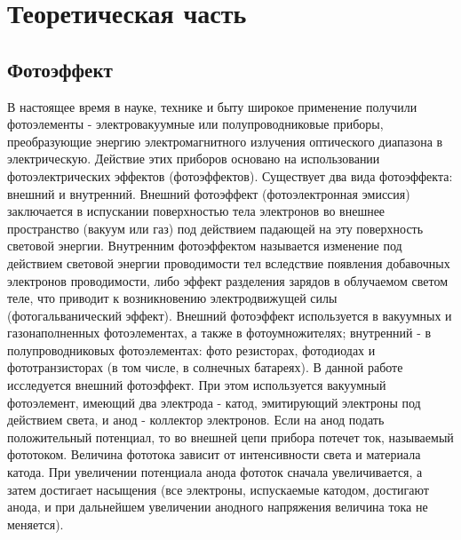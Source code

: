 



\def\labauthors{Сарафанов Ф.Г., Понур К.А., Сидоров Д. Батькович}
\def\labgroup{430}
\def\labnumber{1}
\def\labtheme{Исследование фотоэффекта и измерение постоянной Планка}
\renewcommand{\vec}{\mathbf}
\renewcommand{\Re}{\operatorname{Re}}
\renewcommand{\Im}{\operatorname{Im}}
\renewcommand{\phi}{\varphi}
\renewcommand{\hat}{\widehat}



\tableofcontents
\newpage

\section{Теоретическая часть}
\subsection*{Фотоэффект}
В настоящее время в науке, технике и быту широкое применение получили фотоэлементы - электровакуумные или полупроводниковые приборы, преобразующие энергию электромагнитного излучения оптического диапазона в электрическую. Действие этих приборов основано на использовании фотоэлектрических эффектов (фотоэффектов). 
Существует два вида фотоэффекта: внешний и внутренний. Внешний фотоэффект (фотоэлектронная эмиссия) заключается в испускании поверхностью тела электронов во внешнее пространство (вакуум или газ) под действием падающей на эту поверхность световой энергии. Внутренним фотоэффектом называется изменение под действием световой энергии проводимости тел вследствие появления добавочных электронов проводимости, либо эффект разделения зарядов в облучаемом светом теле, что приводит к возникновению электродвижущей силы (фотогальванический эффект). Внешний фотоэффект используется в вакуумных и газонаполненных фотоэлементах, а также в фотоумножителях; внутренний - в полупроводниковых фотоэлементах: фото резисторах, фотодиодах и фототранзисторах (в том числе, в солнечных батареях).
В данной работе исследуется внешний фотоэффект. При этом используется вакуумный фотоэлемент, имеющий два электрода - катод, эмитирующий электроны под действием света, и анод - коллектор электронов. Если на анод подать положительный потенциал, то во внешней цепи прибора потечет ток, называемый фототоком. Величина фототока зависит от интенсивности света и материала катода. При увеличении потенциала анода фототок сначала увеличивается, а затем достигает насыщения (все электроны, испускаемые катодом, достигают анода, и при дальнейшем увеличении анодного напряжения величина тока не меняется).
